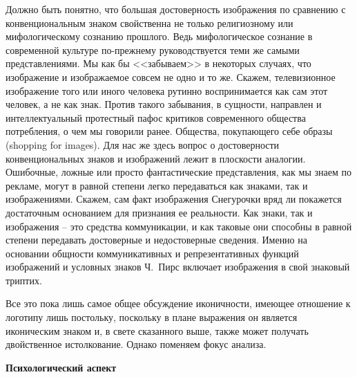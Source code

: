 Должно быть понятно, что большая достоверность изображения по сравнению с
конвенциональным знаком свойственна не только религиозному или
мифологическому сознанию прошлого. Ведь мифологическое сознание в современной
культуре по-прежнему руководствуется теми же самыми представлениями.
Мы как бы <<забываем>> в некоторых случаях, что изображение и изображаемое
совсем не одно и то же. Скажем,
телевизионное изображение того или иного человека рутинно воспринимается
как сам этот человек, а не как знак. Против такого забывания, в
сущности, направлен и интеллектуальный протестный пафос критиков современного
общества потребления, о чем мы говорили ранее. Общества, покупающего себе образы
(shopping for images)\autocite{ginsberg1984supermarket}. Для нас же здесь вопрос о
достоверности конвенциональных знаков и изображений лежит в плоскости аналогии.
Ошибочные, ложные или просто фантастические представления, как мы знаем по
рекламе, могут в равной степени легко передаваться как знаками, так и
изображениями. Скажем, сам факт изображения Снегурочки вряд ли покажется
достаточным основанием для признания ее реальности. Как знаки, так и
изображения -- это средства коммуникации, и как таковые они способны в равной
степени передавать достоверные и недостоверные сведения. Именно на основании
общности коммуникативных и репрезентативных функций изображений и условных знаков
Ч.~Пирс включает изображения в  свой знаковый триптих.

Все это пока лишь самое общее обсуждение иконичности, имеющее отношение
к логотипу лишь постольку, поскольку в плане выражения он  является иконическим
знаком и, в свете сказанного выше, также может получать двойственное
истолкование. Однако поменяем  фокус анализа.

\textbf{Психологический аспект}

